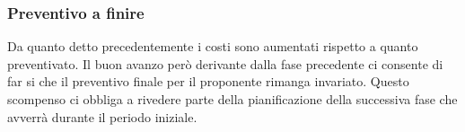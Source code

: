 
			\subsubsection{Preventivo a finire} %
			Da quanto detto precedentemente i costi sono aumentati rispetto a quanto preventivato. Il buon avanzo però derivante dalla fase precedente ci consente di far si che il preventivo finale per il proponente rimanga invariato.
			Questo scompenso ci obbliga a rivedere parte della pianificazione della successiva fase che avverrà durante il periodo iniziale.

